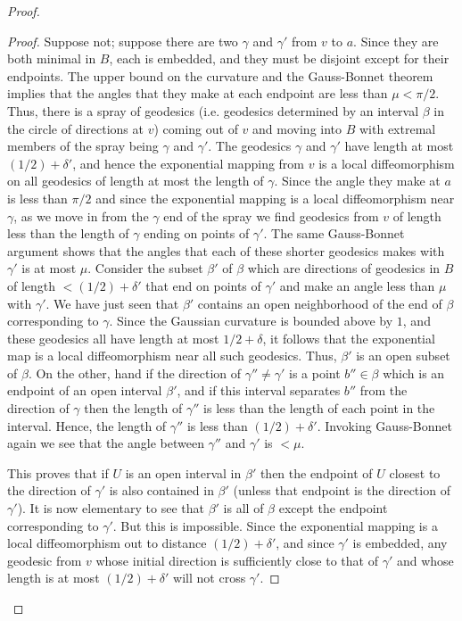 \begin{proof}
\begin{proof}
Suppose not; suppose there are two $\gamma$ and $\gamma'$ from $v$
to $a$. Since they are both minimal in $B$, each is embedded, and
they must be disjoint except for their endpoints. The upper bound on
the curvature and the Gauss-Bonnet theorem implies that the angles
that they make at each endpoint are less than $\mu<\pi/2$. Thus,
there is a spray of geodesics (i.e. geodesics determined by an
interval $\beta$ in the circle of directions at $v$) coming out of
$v$ and moving into $B$ with extremal members of the spray being
$\gamma$ and $\gamma'$. The geodesics $\gamma$ and $\gamma'$ have
length at most $(1/2)+\delta'$, and hence the exponential mapping
from $v$ is a local diffeomorphism on all geodesics of length at
most the length of $\gamma$. Since the angle they make at $a$ is
less than $\pi/2$ and since the exponential mapping is a local
diffeomorphism near $\gamma$, as we move in from the $\gamma$ end of
the spray we find geodesics from $v$ of length less than the length
of $\gamma$ ending on points
 of $\gamma'$. The same
Gauss-Bonnet argument shows that the angles that each of these
shorter geodesics makes with $\gamma'$ is at most $\mu$. Consider
the subset $\beta'$ of $\beta$ which are directions of geodesics in
$B$ of length $<(1/2)+\delta'$ that end on points of $\gamma'$ and
make an angle less than $\mu$ with $\gamma'$. We have just seen that
$\beta'$ contains an open neighborhood of the end of $\beta$
corresponding to $\gamma$. Since the Gaussian curvature is bounded
above by $1$, and these geodesics all have length at most
$1/2+\delta$, it follows that the exponential map is a local
diffeomorphism near all such geodesics. Thus, $\beta'$ is an open
subset of $\beta$. On the other, hand if the direction of
$\gamma''\not=\gamma'$ is a point $b''\in \beta$ which is an
endpoint of an open interval  $ \beta'$, and if this interval
separates $b''$ from the direction of $\gamma$ then the length of
$\gamma''$ is less than the length of each point in the interval.
Hence, the length of $\gamma''$ is less than $(1/2)+\delta'$.
Invoking Gauss-Bonnet again we see that the angle between $\gamma''$
and $\gamma'$ is $<\mu$.

This proves that if $U$ is an open  interval in $\beta'$ then the
endpoint of $U$ closest to the direction of $\gamma'$ is also
contained in $\beta'$ (unless that endpoint is the direction of
$\gamma'$). It is now elementary to see that $\beta'$ is all of
$\beta$ except the endpoint corresponding to $\gamma'$. But this is
impossible. Since the exponential mapping is a local diffeomorphism
out to distance $(1/2)+\delta'$, and since $\gamma'$ is embedded,
any geodesic from $v$ whose initial direction is sufficiently close
to that of $\gamma'$ and whose length is at most $(1/2)+\delta'$
will not cross $\gamma'$.
\end{proof}


\end{proof}
